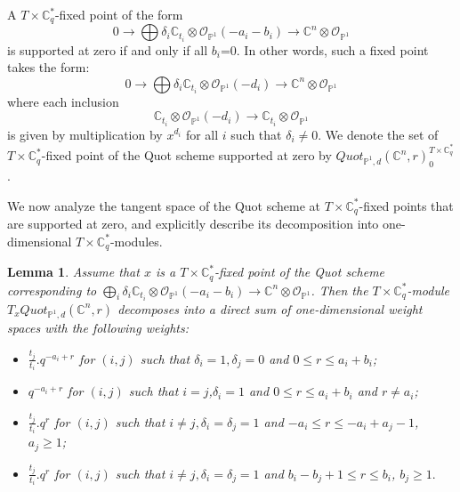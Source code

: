 \documentclass{amsart}
\newtheorem{lemma}[thm]{Lemma}
\begin{document}
A $T \times \mathbb{C}_q^*$-fixed point of the form
\[
0 \to \bigoplus \delta_i\mathbb{C}_{t_i} \otimes \mathcal{O}_{\mathbb{P}^1}(-a_i-b_i) \to \mathbb{C}^n \otimes \mathcal{O}_{\mathbb{P}^1}
\]
 is supported at zero if and only if all $b_i$=0. In other words, such a fixed point takes the form:
\begin{equation} \label{E:quotfixedpt}
0 \to \bigoplus \delta_i\mathbb{C}_{t_i} \otimes \mathcal{O}_{\mathbb{P}^1}(-d_i) \to \mathbb{C}^n \otimes \mathcal{O}_{\mathbb{P}^1}
\end{equation}
where each inclusion 
\[
\mathbb{C}_{t_i} \otimes \mathcal{O}_{\mathbb{P}^1}(-d_i) \to \mathbb{C}_{t_i} \otimes \mathcal{O}_{\mathbb{P}^1}
\]
 is given by multiplication by $x^{d_i}$ for all $i$ such that $\delta_i \ne 0$.
 We denote the set of $T \times \mathbb{C}_q^*$-fixed point of the Quot scheme supported at zero by $Quot_{\mathbb{P}^1,d}(\mathbb{C}^n,r)_{0}^{T \times \mathbb{C}_q^*}$.

 We now analyze the tangent space of the Quot scheme at  $T \times \mathbb{C}_q^*$-fixed points that are supported at zero, and explicitly describe its decomposition into one-dimensional $T \times \mathbb{C}_q^*$-modules.


 \begin{lemma}\label{fixed-point lemma}
Assume that $x$ is a $T \times \mathbb{C}_q^*$-fixed point of the Quot scheme corresponding to $\bigoplus_i \delta_i\mathbb{C}_{t_i} \otimes \mathcal{O}_{\mathbb{P}^1}(-a_i-b_i) \to \mathbb{C}^n \otimes \mathcal{O}_{\mathbb{P}^1}$. 
Then the $T \times \mathbb{C}_q^*$-module $T_xQuot_{\mathbb{P}^1,d}(\mathbb{C}^n,r)$ decomposes into a direct sum of one-dimensional weight spaces with the following weights:
\begin{itemize}
    \item $\frac{t_j}{t_i}.q^{-a_i+r}$ for $(i,j)$ such that $\delta_i= 1 , \delta_j=0$ and $0 \leq r \leq a_i+b_i$;
    \item $q^{-a_i+r}$  for $(i,j)$ such that $i=j$,$\delta_i=1$ and $0 \leq r \leq a_i+b_i$ and $r \neq a_i$;
    \item $\frac{t_j}{t_i}.q^r$ for $(i,j)$ such that $i \ne j, \delta_i = \delta_j=1$ and $-a_i \leq r \leq -a_i+a_j-1$, $a_j \geq 1$;
    \item $\frac{t_j}{t_i}.q^r$ for $(i,j)$ such that $i \ne j, \delta_i = \delta_j=1$ and $b_i-b_j+1 \leq r \leq b_i$, $b_j \geq 1.$
\end{itemize}
 \end{lemma}
\end{document}

